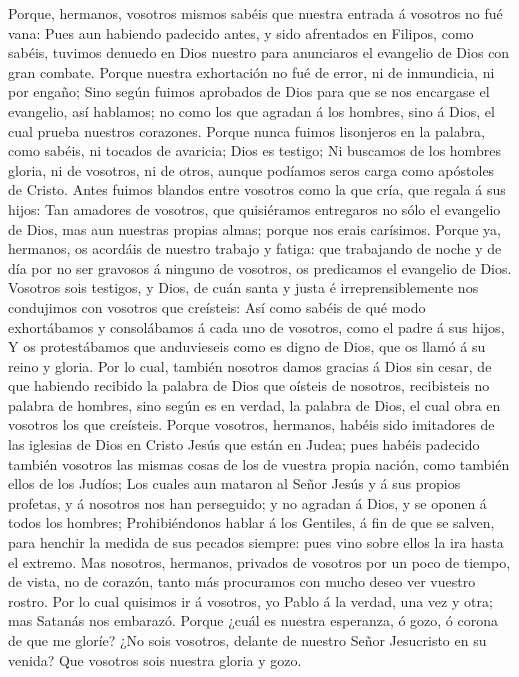  Porque, hermanos, vosotros mismos sabéis que nuestra
entrada á vosotros no fué vana:  Pues aun habiendo padecido
antes, y sido afrentados en Filipos, como sabéis, tuvimos denuedo en
Dios nuestro para anunciaros el evangelio de Dios con gran combate.
 Porque nuestra exhortación no fué de error, ni de
inmundicia, ni por engaño;  Sino según fuimos aprobados de
Dios para que se nos encargase el evangelio, así hablamos; no como los
que agradan á los hombres, sino á Dios, el cual prueba nuestros
corazones.  Porque nunca fuimos lisonjeros en la palabra,
como sabéis, ni tocados de avaricia; Dios es testigo;  Ni
buscamos de los hombres gloria, ni de vosotros, ni de otros, aunque
podíamos seros carga como apóstoles de Cristo.  Antes fuimos
blandos entre vosotros como la que cría, que regala á sus hijos:
 Tan amadores de vosotros, que quisiéramos entregaros no
sólo el evangelio de Dios, mas aun nuestras propias almas; porque nos
erais carísimos.  Porque ya, hermanos, os acordáis de
nuestro trabajo y fatiga: que trabajando de noche y de día por no ser
gravosos á ninguno de vosotros, os predicamos el evangelio de Dios.
 Vosotros sois testigos, y Dios, de cuán santa y justa é
irreprensiblemente nos condujimos con vosotros que creísteis:
 Así como sabéis de qué modo exhortábamos y consolábamos á
cada uno de vosotros, como el padre á sus hijos,  Y os
protestábamos que anduvieseis como es digno de Dios, que os llamó á su
reino y gloria.  Por lo cual, también nosotros damos
gracias á Dios sin cesar, de que habiendo recibido la palabra de Dios
que oísteis de nosotros, recibisteis no palabra de hombres, sino según
es en verdad, la palabra de Dios, el cual obra en vosotros los que
creísteis.  Porque vosotros, hermanos, habéis sido
imitadores de las iglesias de Dios en Cristo Jesús que están en Judea;
pues habéis padecido también vosotros las mismas cosas de los de vuestra
propia nación, como también ellos de los Judíos;  Los
cuales aun mataron al Señor Jesús y á sus propios profetas, y á nosotros
nos han perseguido; y no agradan á Dios, y se oponen á todos los
hombres;  Prohibiéndonos hablar á los Gentiles, á fin de
que se salven, para henchir la medida de sus pecados siempre: pues vino
sobre ellos la ira hasta el extremo.  Mas nosotros,
hermanos, privados de vosotros por un poco de tiempo, de vista, no de
corazón, tanto más procuramos con mucho deseo ver vuestro rostro.
 Por lo cual quisimos ir á vosotros, yo Pablo á la verdad,
una vez y otra; mas Satanás nos embarazó.  Porque ¿cuál es
nuestra esperanza, ó gozo, ó corona de que me gloríe? ¿No sois vosotros,
delante de nuestro Señor Jesucristo en su venida?  Que
vosotros sois nuestra gloria y gozo.

